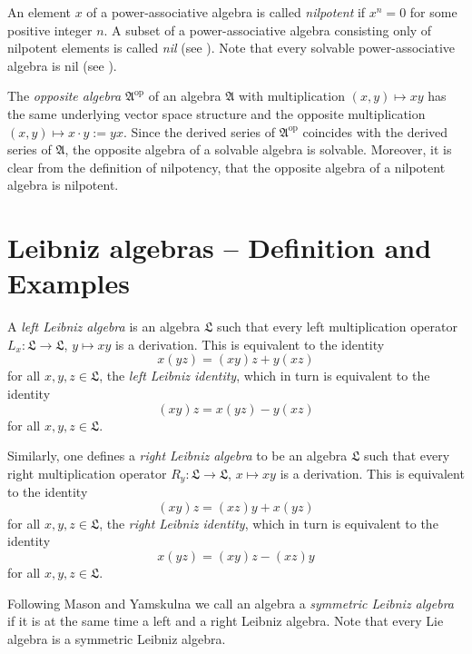 \documentclass{amsart}
\numberwithin{equation}{section}
\newcommand{\op}{\mathrm{op}}
\newcommand{\af}{\mathfrak{A}}
\newcommand{\lf}{\mathfrak{L}}
\begin{document}
An element $x$ of a power-associative algebra is called {\em nilpotent\/} if $x^n=0$ for some
positive integer $n$. A subset of a power-associative algebra consisting only of nilpotent elements
is called {\em nil\/} (see \cite[p.\ 30]{S}). Note that every solvable power-associative algebra is
nil (see \cite[p.\ 31]{S}).

The {\em opposite algebra\/} $\af^\op$ of an algebra $\af$ with multiplication $(x,y)\mapsto xy$
has the same underlying vector space structure and the opposite multiplication $(x,y)\mapsto x
\cdot y:=yx$. Since the derived series of $\af^\op$ coincides with the derived series of $\af$,
the opposite algebra of a solvable algebra is solvable. Moreover, it is clear from the definition of
nilpotency, that the opposite algebra of a nilpotent algebra is nilpotent.


\section{Leibniz algebras -- Definition and Examples}


A {\em left Leibniz algebra\/} is an algebra $\lf$ such that every left multiplication operator
$L_x:\lf\to\lf$, $y\mapsto xy$ is a derivation. This is equivalent to the identity
\begin{equation}\label{LLI}
x(yz)=(xy)z+y(xz)
\end{equation}
for all $x,y,z\in\lf$, the {\em left Leibniz identity\/}, which in turn is equivalent to the identity
\begin{equation}\label{RLLI}
(xy)z=x(yz)-y(xz)
\end{equation}
for all $x,y,z\in\lf$.

Similarly, one defines a {\em right Leibniz algebra\/} to be an algebra $\lf$ such that every right
multiplication operator $R_y:\lf\to\lf$, $x\mapsto xy$ is a derivation. This is equivalent to the
identity
\begin{equation}\label{RLI}
(xy)z=(xz)y+x(yz)
\end{equation}
for all $x,y,z\in\lf$, the {\em right Leibniz identity\/}, which in turn is equivalent to the identity
\begin{equation}\label{LRLI}
x(yz)=(xy)z-(xz)y
\end{equation}
for all $x,y,z\in\lf$.

Following Mason and Yamskulna \cite{MY} we call an algebra a {\em symmetric Leibniz algebra\/}
if it is at the same time a left and a right Leibniz algebra. Note that every Lie algebra is a symmetric
Leibniz algebra.
\end{document}

